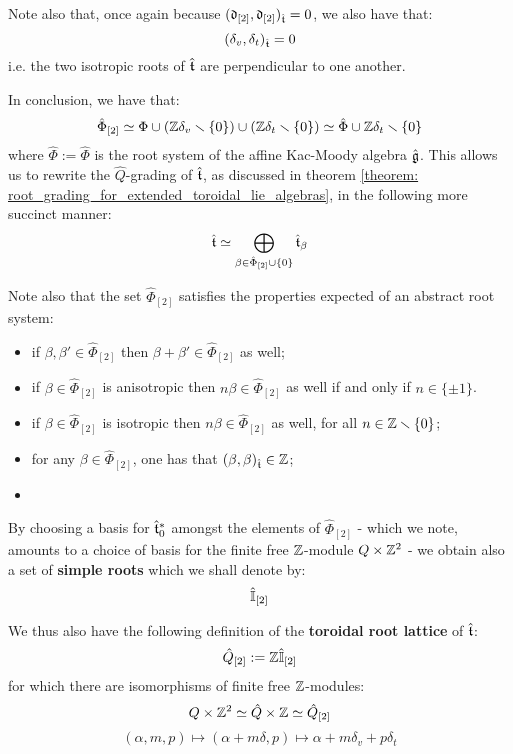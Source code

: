 \begin{remark}
\begin{enumerate}
                Note also that, once again because $(\mathfrak{d}_{[2]}, \mathfrak{d}_{[2]})_{\hat{\mathfrak{t}}} = 0$, we also have that:
                    $$(\delta_v, \delta_t)_{\hat{\mathfrak{t}}} = 0$$
                i.e. the two isotropic roots of $\hat{\mathfrak{t}}$ are perpendicular to one another. 
            \end{enumerate}

            In conclusion, we have that:
                $$\hat{\Phi}_{[2]} \simeq \Phi \cup (\mathbb{Z} \delta_v \smallsetminus \{0\}) \cup (\mathbb{Z} \delta_t \smallsetminus \{0\}) \simeq \hat{\Phi} \cup \mathbb{Z} \delta_t \smallsetminus \{0\}$$
            where $\hat{\Phi} := \hat{\Phi}$ is the root system of the affine Kac-Moody algebra $\hat{\mathfrak{g}}$. This allows us to rewrite the $\hat{Q}$-grading of $\hat{\mathfrak{t}}$, as discussed in theorem \ref{theorem: root_grading_for_extended_toroidal_lie_algebras}, in the following more succinct manner:
                $$\hat{\mathfrak{t}} \simeq \bigoplus_{\beta \in \hat{\Phi}_{[2]} \cup \{0\}} \hat{\mathfrak{t}}_{\beta}$$

            Note also that the set $\hat{\Phi}_{[2]}$ satisfies the properties expected of an abstract root system:
            \begin{itemize}
                \item if $\beta, \beta' \in \hat{\Phi}_{[2]}$ then $\beta + \beta' \in \hat{\Phi}_{[2]}$ as well;
                \item if $\beta \in \hat{\Phi}_{[2]}$ is anisotropic then $n \beta \in \hat{\Phi}_{[2]}$ as well if and only if $n \in \{\pm 1\}$.
                \item if $\beta \in \hat{\Phi}_{[2]}$ is isotropic then $n\beta \in \hat{\Phi}_{[2]}$ as well, for all $n \in \mathbb{Z} \smallsetminus \{0\}$;
                \item for any $\beta \in \hat{\Phi}_{[2]}$, one has that $(\beta, \beta)_{\hat{\mathfrak{t}}} \in \mathbb{Z}$;
                \item {}
            \end{itemize}
            By choosing a basis for $\hat{\mathfrak{t}}_0^*$ amongst the elements of $\hat{\Phi}_{[2]}$ - which we note, amounts to a choice of basis for the finite free $\mathbb{Z}$-module $Q \x \Z^2$ - we obtain also a set of \textbf{simple roots} which we shall denote by:
                $$\hat{\mathbb{I}}_{[2]}$$

            We thus also have the following definition of the \textbf{toroidal root lattice} of $\hat{\mathfrak{t}}$:
                $$\hat{Q}_{[2]} := \mathbb{Z} \hat{\mathbb{I}}_{[2]}$$
            for which there are isomorphisms of finite free $\mathbb{Z}$-modules:
                $$Q \x \Z^2 \cong \hat{Q} \x \Z \cong \hat{Q}_{[2]}$$
                $$(\alpha, m, p) \mapsto (\alpha + m \delta, p) \mapsto \alpha + m \delta_v + p \delta_t$$
        \end{remark}
